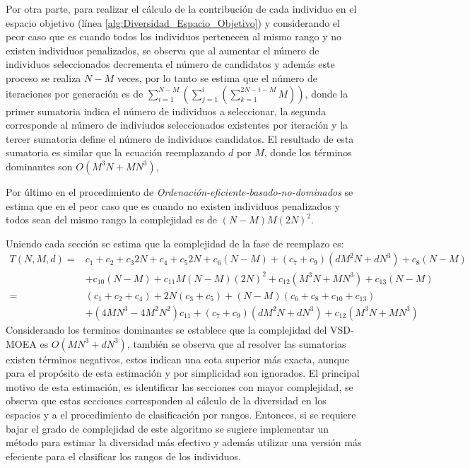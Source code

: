 %
Por otra parte, para realizar el cálculo de la contribución de cada individuo en el espacio objetivo (línea \ref{alg:Diversidad_Espacio_Objetivo}) y considerando el peor caso que es cuando todos los individuos pertenecen al mismo rango y no existen individuos penalizados, se observa que al aumentar el número de individuos seleccionados decrementa el número de candidatos y además este proceso se realiza $N-M$ veces, por lo tanto se estima que el número de iteraciones por generación es de $\sum_{i=1}^{N-M}( \sum_{j=1}^{i} ( \sum_{k=1}^{2N-i-M} M ) )$, donde la primer sumatoria indica el número de individuos a seleccionar, la segunda corresponde al número de indiviudos seleccionados existentes por iteración y la tercer sumatoria define el número de individuos candidatos.
%
El resultado de esta sumatoria es similar que la ecuación reemplazando $d$ por $M$, donde los términos dominantes son $O(M^3 N + MN^3)$, 

Por último en el procedimiento de \textit{Ordenación-eficiente-basado-no-dominados} se estima que en el peor caso que es cuando no existen individuos penalizados y todos sean del mismo rango la complejidad es de $(N-M)M(2N)^2$.
%

Uniendo cada sección se estima que la complejidad de la fase de reemplazo es:
\begin{equation}
\begin{split}
T(N,M,d) =& c_1 + c_2 + c_3 2N + c_4 + c_5 2N + c_6(N-M) + (c_7+c_9)(dM^2N + dN^3) + c_8(N-M)\\
	 &+ c_{10}(N-M) + c_{11} M(N-M)(2N)^2 + c_{12}(M^3N + MN^3) + c_{13}(N-M) \\
	=& (c_1 + c_2 + c_4) + 2N(c_3 + c_5) + (N-M)(c_6 + c_8 + c_{10} + c_{13}) \\
	&+ (4MN^3 - 4M^2N^2 )c_{11} + (c_7+c_9)(dM^2N + dN^3) + c_{12}(M^3N + MN^3)
\end{split}
\end{equation}
%
Considerando los terminos dominantes se establece que la complejidad del VSD-MOEA es $O(MN^3 + dN^3)$, también se observa que al resolver las sumatorias existen términos negativos, estos indican una cota superior más exacta, aunque para el propósito de esta estimación y por simplicidad son ignorados.
%
El principal motivo de esta estimación, es identificar las secciones con mayor complejidad, se observa que estas secciones corresponden al cálculo de la diversidad en los espacios y a el procedimiento de clasificación por rangos.
%
Entonces, si se requiere bajar el grado de complejidad de este algoritmo se sugiere implementar un método para estimar la diversidad más efectivo y además utilizar una versión más efeciente para el clasificar los rangos de los individuos.
%

